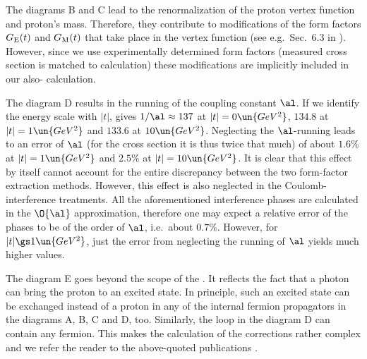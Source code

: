 The diagrams  B and C lead to the renormalization of the proton vertex function and proton's mass. Therefore, they contribute to modifications of the form factors $G_{\rm E}(t)$ and $G_{\rm M}(t)$ that take place in the  vertex function (see e.g.~Sec.~6.3 in ). However, since we use experimentally determined form factors (measured cross section is matched to  calculation) these modifications are implicitly included in our also- calculation.

The diagram  D results in the running of the coupling constant $\al$. If we identify the energy scale with $|t|$,  gives $1/\al \approx 137$ at $|t| = 0\un{GeV^2}$, $134.8$ at $|t| = 1 \un{GeV^2}$ and $133.6$ at $10\un{GeV^2}$. Neglecting the $\al$-running leads to an error of $\al$ (for the cross section it is thus twice that much) of about $1.6\percent$ at $|t| = 1 \un{GeV^2}$ and $2.5\percent$ at $|t| = 10 \un{GeV^2}$. It is clear that this effect by itself cannot account for the entire discrepancy between the two form-factor extraction methods. However, this effect is also neglected in the Coulomb-interference treatments. All the aforementioned interference phases are calculated in the $\O{\al}$ approximation, therefore one may expect a relative error of the phases to be of the order of $\al$, i.e.~about $0.7\percent$. However, for $|t| \gs 1\un{GeV^2}$, just the error from neglecting the running of $\al$ yields much higher values.

The diagram  E goes beyond the scope of the . It reflects the fact that a photon can bring the proton to an excited state. In principle, such an excited state can be exchanged instead of a proton in any of the internal fermion propagators in the diagrams A, B, C and D, too. Similarly, the loop in the diagram D can contain any fermion. This makes the calculation of the  corrections rather complex and we refer the reader to the above-quoted publications .


